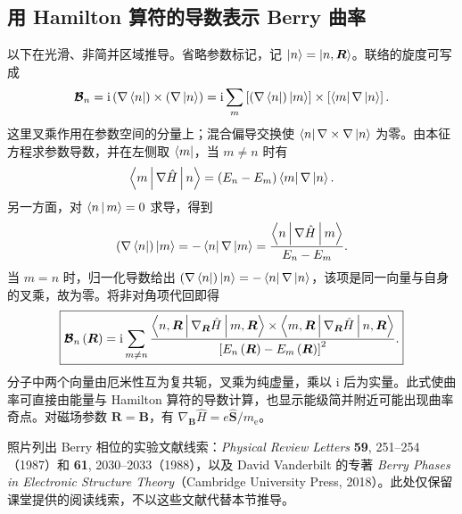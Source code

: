 \subsection{用 Hamilton 算符的导数表示 Berry 曲率}
以下在光滑、非简并区域推导。省略参数标记，记 $\Ket{n}=\Ket{n,\bm R}$。联络的旋度可写成
\begin{equation}
\bm{\mathcal B}_n=\mathrm{i}\left(\nabla\Bra{n}\right)\times\left(\nabla\Ket{n}\right)
=\mathrm{i}\sum_m\left[\left(\nabla\Bra{n}\right)\Ket{m}\right]
\times\left[\Bra{m}\nabla\Ket{n}\right].
\end{equation}
这里叉乘作用在参数空间的分量上；混合偏导交换使 $\Bra{n}\nabla\times\nabla\Ket{n}$ 为零。由本征方程求参数导数，并在左侧取 $\Bra{m}$，当 $m\neq n$ 时有
\begin{equation}
\Braket{m|\nabla\hat H|n}=\left(E_n-E_m\right)\Bra{m}\nabla\Ket{n}.
\end{equation}
另一方面，对 $\Braket{n|m}=0$ 求导，得到
\begin{equation}
\left(\nabla\Bra{n}\right)\Ket{m}=-\Bra{n}\nabla\Ket{m}
=\frac{\Braket{n|\nabla\hat H|m}}{E_n-E_m}.
\end{equation}
当 $m=n$ 时，归一化导数给出 $\left(\nabla\Bra{n}\right)\Ket{n}=-\Bra{n}\nabla\Ket{n}$，该项是同一向量与自身的叉乘，故为零。将非对角项代回即得
\begin{equation}
\boxed{\bm{\mathcal B}_n\left(\bm R\right)=\mathrm{i}\sum_{m\neq n}
\frac{\Braket{n,\bm R|\nabla_{\bm R}\hat H|m,\bm R}
\times\Braket{m,\bm R|\nabla_{\bm R}\hat H|n,\bm R}}
{\left[E_n\left(\bm R\right)-E_m\left(\bm R\right)\right]^2}.}
\end{equation}
分子中两个向量由厄米性互为复共轭，叉乘为纯虚量，乘以 $\mathrm{i}$ 后为实量。此式使曲率可直接由能量与 Hamilton 算符的导数计算，也显示能级简并附近可能出现曲率奇点。对磁场参数 $\bm R=\bm B$，有 $\nabla_{\bm B}\hat H=e\hat{\bm S}/m_{\mathrm e}$。

\begin{remark}[课堂延伸阅读]
照片列出 Berry 相位的实验文献线索：\emph{Physical Review Letters} \textbf{59}, 251--254（1987）和 \textbf{61}, 2030--2033（1988），以及 David Vanderbilt 的专著 \emph{Berry Phases in Electronic Structure Theory}（Cambridge University Press, 2018）。此处仅保留课堂提供的阅读线索，不以这些文献代替本节推导。
\end{remark}
